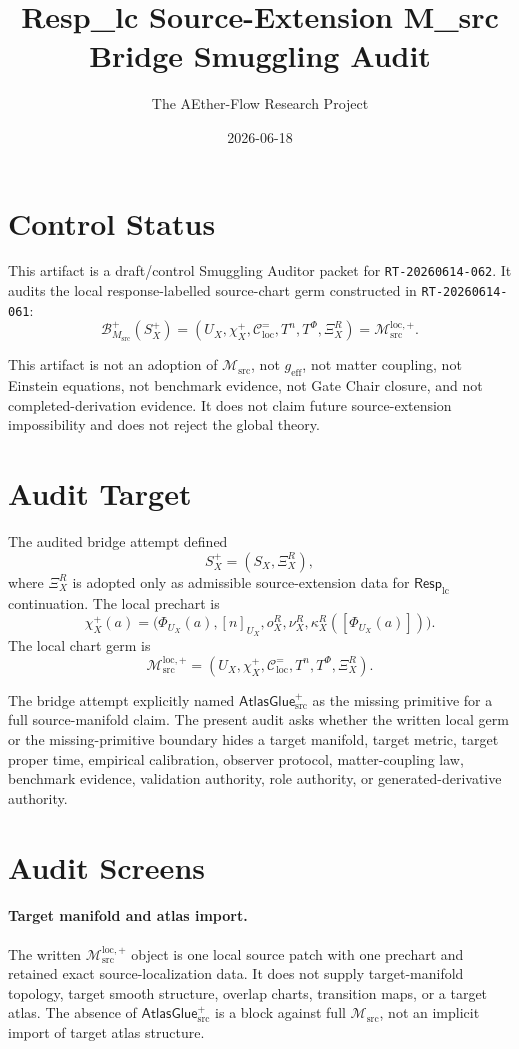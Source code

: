 \documentclass[11pt]{article}
\title{Resp\_lc Source-Extension M\_src Bridge Smuggling Audit}
\author{The AEther-Flow Research Project}
\date{2026-06-18}
\newcommand{\RespLC}{\mathsf{Resp}_{\mathrm{lc}}}
\newcommand{\Msrc}{\mathcal{M}_{\mathrm{src}}}
\newcommand{\Mloc}{\mathcal{M}_{\mathrm{src}}^{\mathrm{loc},+}}
\newcommand{\geff}{g_{\mathrm{eff}}}
\newcommand{\XiR}{\Xi_X^R}
\newcommand{\SX}{S_X}
\newcommand{\Splus}{S_X^+}
\newcommand{\PhiU}{\Phi_{U_X}}
\newcommand{\Cexact}{\mathcal{C}^{=}_{\mathrm{loc}}}
\newcommand{\BMsrc}{\mathcal{B}^{+}_{M_{\mathrm{src}}}}
\newcommand{\AtlasGlue}{\mathsf{AtlasGlue}_{\mathrm{src}}^{+}}
\begin{document}
\maketitle

\section*{Control Status}

This artifact is a draft/control Smuggling Auditor packet for
\texttt{RT-20260614-062}. It audits the local response-labelled source-chart
germ constructed in \texttt{RT-20260614-061}:
\[
  \BMsrc(\Splus)=
  (U_X,\chi_X^+,\Cexact,T^n,T^\Phi,\XiR)=\Mloc.
\]

This artifact is not an adoption of \(\Msrc\), not \(\geff\), not matter
coupling, not Einstein equations, not benchmark evidence, not Gate Chair
closure, and not completed-derivation evidence. It does not claim future
source-extension impossibility and does not reject the global theory.

\section{Audit Target}

The audited bridge attempt defined
\[
  \Splus=(\SX,\XiR),
\]
where \(\XiR\) is adopted only as admissible source-extension data for
\(\RespLC\) continuation. The local prechart is
\[
  \chi_X^+(a)=
  \bigl(\PhiU(a),[n]_{U_X},o_X^R,\nu_X^R,
  \kappa_X^R([\PhiU(a)])\bigr).
\]
The local chart germ is
\[
  \Mloc=(U_X,\chi_X^+,\Cexact,T^n,T^\Phi,\XiR).
\]

The bridge attempt explicitly named \(\AtlasGlue\) as the missing primitive
for a full source-manifold claim. The present audit asks whether the written
local germ or the missing-primitive boundary hides a target manifold, target
metric, target proper time, empirical calibration, observer protocol,
matter-coupling law, benchmark evidence, validation authority, role authority,
or generated-derivative authority.

\section{Audit Screens}

\paragraph{Target manifold and atlas import.}
The written \(\Mloc\) object is one local source patch with one prechart and
retained exact source-localization data. It does not supply target-manifold
topology, target smooth structure, overlap charts, transition maps, or a target
atlas. The absence of \(\AtlasGlue\) is a block against full \(\Msrc\), not an
implicit import of target atlas structure.
\end{document}
